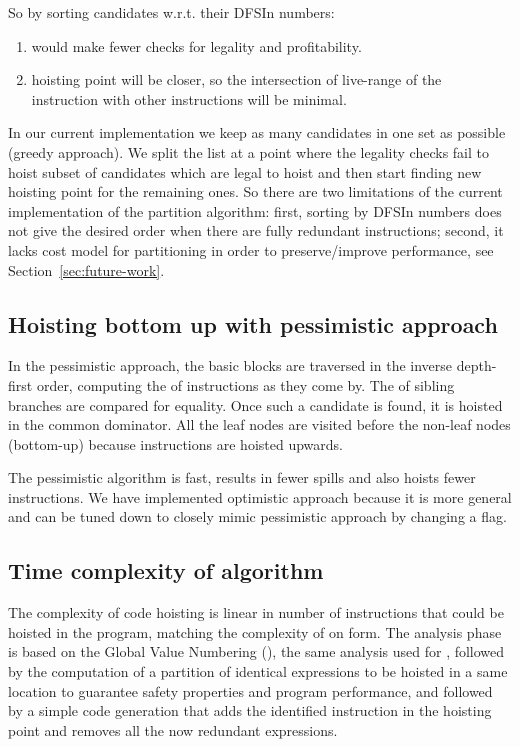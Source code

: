 \documentclass{sig-alternate}
\begin{document}
So by sorting candidates w.r.t. their DFSIn numbers:
\begin{enumerate}
\item would make fewer checks for legality and profitability.
\item hoisting point will be closer, so the intersection of live-range of the
  instruction with other instructions will be minimal.
\end{enumerate}

In our current implementation we keep as many candidates in one set as possible
(greedy approach). We split the list at a point where the legality checks fail
to hoist subset of candidates which are legal to hoist and then start finding
new hoisting point for the remaining ones. So there are two limitations of the
current implementation of the partition algorithm: first, sorting by DFSIn
numbers does not give the desired order when there are fully redundant
instructions; second, it lacks cost model for partitioning in order to
preserve/improve performance, see Section~\ref{sec:future-work}.

\subsection{Hoisting bottom up with pessimistic approach}
\label{subsec:pessimistic}
In the pessimistic approach, the basic blocks are traversed in the inverse
depth-first order, computing the \GVN{} of instructions as they come by. The \GVN{} of
sibling branches are compared for equality. Once such a candidate is found, it
is hoisted in the common dominator. All the leaf nodes are visited before the
non-leaf nodes (bottom-up) because instructions are hoisted upwards.

The pessimistic algorithm is fast, results in fewer spills and also hoists fewer
instructions. We have implemented optimistic approach because it is more general
and can be tuned down to closely mimic pessimistic approach by changing a flag.

\subsection{Time complexity of algorithm}
The complexity of code hoisting is linear in number of instructions that could
be hoisted in the program, matching the complexity of \PRE{} on \SSA{} form.  The
analysis phase is based on the Global Value Numbering (\GVN{}), the same analysis
used for \PRE{}, followed by the computation of a partition of identical
expressions to be hoisted in a same location to guarantee safety properties and
program performance, and followed by a simple code generation that adds the
identified instruction in the hoisting point and removes all the now redundant
expressions.
\end{document}
